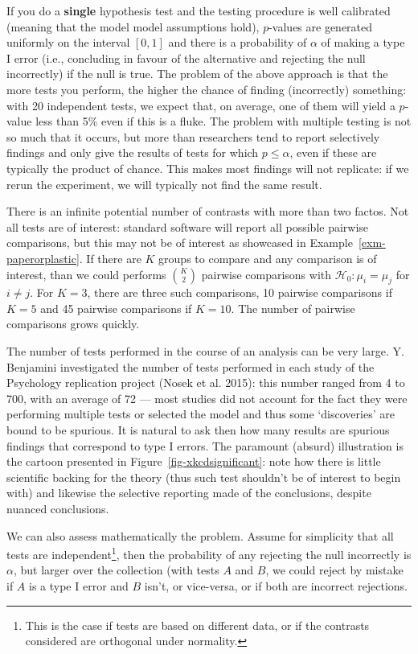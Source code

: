 \documentclass[
  11pt,
  letterpaper,
]{scrbook}
\theoremstyle{definition}
\theoremstyle{remark}
\begin{document}
If you do a \textbf{single} hypothesis test and the testing procedure is
well calibrated (meaning that the model model assumptions hold),
\(p\)-values are generated uniformly on the interval \([0,1]\) and there
is a probability of \(\alpha\) of making a type I error (i.e.,
concluding in favour of the alternative and rejecting the null
incorrectly) if the null is true. The problem of the above approach is
that the more tests you perform, the higher the chance of finding
(incorrectly) something: with 20 independent tests, we expect that, on
average, one of them will yield a \(p\)-value less than 5\% even if this
is a fluke. The problem with multiple testing is not so much that it
occurs, but more than researchers tend to report selectively findings
and only give the results of tests for which \(p \leq \alpha\), even if
these are typically the product of chance. This makes most findings will
not replicate: if we rerun the experiment, we will typically not find
the same result.

There is an infinite potential number of contrasts with more than two
factos. Not all tests are of interest: standard software will report all
possible pairwise comparisons, but this may not be of interest as
showcased in Example~\ref{exm-paperorplastic}. If there are \(K\) groups
to compare and any comparison is of interest, than we could performs
\(\binom{K}{2}\) pairwise comparisons with
\(\mathscr{H}_{0}: \mu_i = \mu_j\) for \(i \neq j\). For \(K=3\), there
are three such comparisons, 10 pairwise comparisons if \(K=5\) and 45
pairwise comparisons if \(K=10\). The number of pairwise comparisons
grows quickly.

The number of tests performed in the course of an analysis can be very
large. Y. Benjamini investigated the number of tests performed in each
study of the Psychology replication project (Nosek et al. 2015): this
number ranged from 4 to 700, with an average of 72 --- most studies did
not account for the fact they were performing multiple tests or selected
the model and thus some `discoveries' are bound to be spurious. It is
natural to ask then how many results are spurious findings that
correspond to type I errors. The paramount (absurd) illustration is the
cartoon presented in Figure~\ref{fig-xkcdsignificant}: note how there is
little scientific backing for the theory (thus such test shouldn't be of
interest to begin with) and likewise the selective reporting made of the
conclusions, despite nuanced conclusions.

We can also assess mathematically the problem. Assume for simplicity
that all tests are independent\footnote{This is the case if tests are
  based on different data, or if the contrasts considered are orthogonal
  under normality.}, then the probability of any rejecting the null
incorrectly is \(\alpha\), but larger over the collection (with tests
\(A\) and \(B\), we could reject by mistake if \(A\) is a type I error
and \(B\) isn't, or vice-versa, or if both are incorrect rejections.
\end{document}
